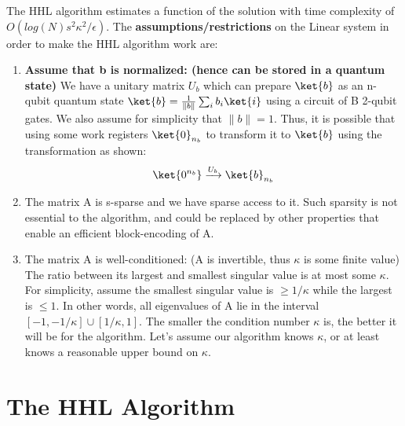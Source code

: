 \documentclass[12pt, oneside]{book}
\theoremstyle{definition}
\theoremstyle{definition}
\theoremstyle{remark}
\begin{document}
The HHL algorithm estimates a function of the solution with time complexity of $O(log(N)s^2\kappa^2/\epsilon)$.
The \textbf{assumptions/restrictions} on the Linear system in order to make the HHL algorithm work are:
\begin{enumerate}
\item \textbf{Assume that b is normalized: (hence can be stored in a quantum state) }We have a unitary matrix $U_b$ which can prepare $\ket{b}$ as an n-qubit quantum state $\ket{b}=\frac{1}{\|b\|}\sum_ib_i\ket{i}$
    using a circuit of B 2-qubit gates. We also assume for simplicity that $\|b\|=1$.
    Thus, it is possible that using some work registers $\ket{0}_{n_b}$ to transform it to $\ket{b}$ using the transformation as shown:
    \[
        \ket{0^{n_b}} \xrightarrow{U_b} \ket{b}_{n_b}
    \]
\item The matrix A is s-sparse and we have sparse access to it. Such sparsity is not essential to the algorithm, and could be replaced by other properties that enable an efficient
    block-encoding of A.
\item The matrix A is well-conditioned: (A is invertible, thus $\kappa$ is some finite value) The ratio between its largest and smallest singular value
    is at most some $\kappa$. For simplicity, assume the smallest singular value is $\geq 1/\kappa$ while the largest is $\leq1$. In other words, all eigenvalues of A lie in the 
    interval $[-1,-1/\kappa] \cup [1/\kappa,1]$. The smaller the condition number $\kappa$ is, the better it will be for the algorithm. Let's assume our algorithm knows $\kappa$, or at least knows a reasonable 
    upper bound on $\kappa$.
\end{enumerate}

\section{The HHL Algorithm}
\end{document}
